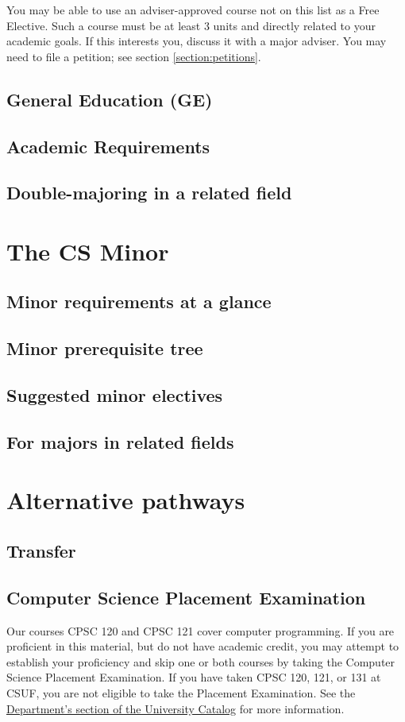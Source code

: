 \documentclass{book}
\newcommand{\campusname}{CSUF}
\begin{document}
You may be able to use an adviser-approved course not on this list as a Free Elective. Such a course must be at least 3 units and directly related to your academic goals. If this interests you, discuss it with a major adviser. You may need to file a petition; see section \ref{section:petitions}.

\section{General Education (GE)}
\section{Academic Requirements}
\section{Double-majoring in a related field}

\chapter{The CS Minor}

\section{Minor requirements at a glance}
\section{Minor prerequisite tree}
\section{Suggested minor electives}
\section{For majors in related fields}

\chapter{Alternative pathways}

\section{Transfer}

\section{Computer Science Placement Examination}
Our courses CPSC 120 and CPSC 121 cover computer programming. If you are proficient in this material, but do not have academic credit, you may attempt to establish your proficiency and skip one or both courses by taking the Computer Science Placement Examination. If you have taken CPSC 120, 121, or 131 at \campusname, you are not eligible to take the Placement Examination. See the \href{http://catalog.fullerton.edu/preview_program.php?catoid=2&poid=537&returnto=137}{Department's section of the University Catalog} for more information.
\end{document}

